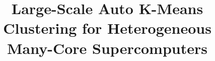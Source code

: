 \documentclass[10pt,journal,compsoc]{IEEEtran}
\begin{document}
%
\title{Large-Scale Auto K-Means Clustering for Heterogeneous Many-Core Supercomputers}
%
%
%
%
\end{document}
